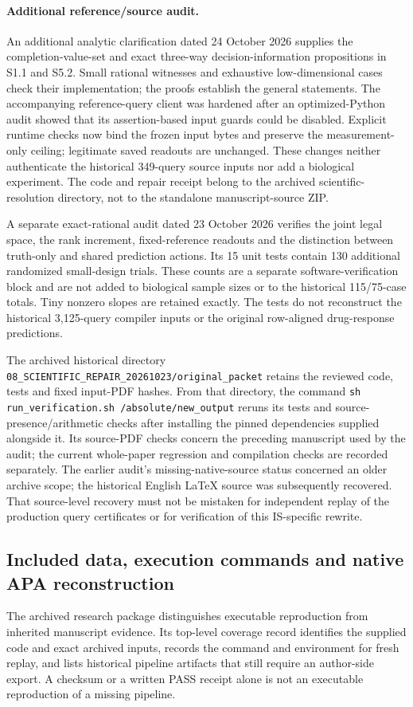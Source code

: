 \documentclass[11pt]{article}
\begin{document}
\paragraph{Additional reference/source audit.}
An additional analytic clarification dated 24 October 2026 supplies the completion-value-set and exact three-way decision-information propositions in S1.1 and S5.2. Small rational witnesses and exhaustive low-dimensional cases check their implementation; the proofs establish the general statements. The accompanying reference-query client was hardened after an optimized-Python audit showed that its assertion-based input guards could be disabled. Explicit runtime checks now bind the frozen input bytes and preserve the measurement-only ceiling; legitimate saved readouts are unchanged. These changes neither authenticate the historical 349-query source inputs nor add a biological experiment. The code and repair receipt belong to the archived scientific-resolution directory, not to the standalone manuscript-source ZIP.

A separate exact-rational audit dated 23 October 2026 verifies the joint legal space, the rank increment, fixed-reference readouts and the distinction between truth-only and shared prediction actions. Its 15 unit tests contain 130 additional randomized small-design trials. These counts are a separate software-verification block and are not added to biological sample sizes or to the historical 115/75-case totals. Tiny nonzero slopes are retained exactly. The tests do not reconstruct the historical 3,125-query compiler inputs or the original row-aligned drug-response predictions.

The archived historical directory \texttt{08\_SCIENTIFIC\_REPAIR\_20261023/original\_packet} retains the reviewed code, tests and fixed input-PDF hashes. From that directory, the command \texttt{sh run\_verification.sh /absolute/new\_output} reruns its tests and source-presence/arithmetic checks after installing the pinned dependencies supplied alongside it. Its source-PDF checks concern the preceding manuscript used by the audit; the current whole-paper regression and compilation checks are recorded separately. The earlier audit's missing-native-source status concerned an older archive scope; the historical English LaTeX source was subsequently recovered. That source-level recovery must not be mistaken for independent replay of the production query certificates or for verification of this IS-specific rewrite.

\subsection{Included data, execution commands and native APA reconstruction}
The archived research package distinguishes executable reproduction from inherited manuscript evidence. Its top-level coverage record identifies the supplied code and exact archived inputs, records the command and environment for fresh replay, and lists historical pipeline artifacts that still require an author-side export. A checksum or a written PASS receipt alone is not an executable reproduction of a missing pipeline.
\end{document}
